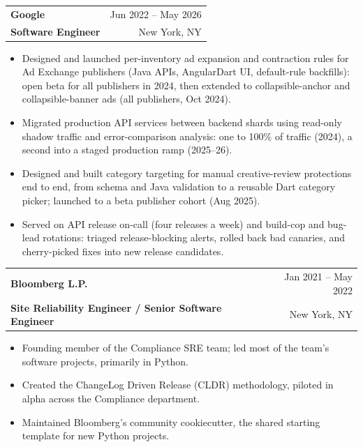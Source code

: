 \documentclass[letterpaper,10pt]{article}
\makeatletter
\newif\iffull
\newcommand{\more}[1]{\iffull#1\fi}
\newcommand{\short}[1]{\iffull\else#1\fi}
\newcommand{\sep}{\hspace{0.4em}{\color{hair}\textbullet}\hspace{0.4em}}
\newcommand{\role}[5]{%
  \par\addvspace{\iffull 8pt\else 4.5pt\fi}\needspace{3\baselineskip}%
  \noindent\begin{tabular*}{\textwidth}{@{}l@{\extracolsep{\fill}}r@{}}
    {\bfseries\fontsize{10.6pt}{12.6pt}\selectfont #1}%
      \if\relax\detokenize{#2}\relax\else{\color{muted}\sep #2}\fi &
    {\color{muted}\fontsize{9.4pt}{11pt}\selectfont #3} \\[0.2pt]
    {\color{accent}\bfseries\fontsize{9.6pt}{11.5pt}\selectfont #4} &
    {\color{muted}\fontsize{9.4pt}{11pt}\selectfont #5}
  \end{tabular*}\par\nobreak
}
\makeatother
\begin{document}
\role{Google}{Ad Manager}{Jun 2022 -- May 2026}
     {Software Engineer}{New York, NY}
\begin{itemize}
  \short{\item Designed and launched per-inventory ad expansion and contraction rules for Ad
        Exchange publishers (Java APIs, AngularDart UI, default-rule backfills): open beta for all
        publishers in 2024, then extended to collapsible-anchor and collapsible-banner ads (all
        publishers, Oct 2024).}
  \more{\item Designed and launched per-inventory ad expansion and contraction rules for Ad
        Exchange publishers (Java APIs, AngularDart UI, default rules backfilled for every
        network) to an open beta for all publishers in 2024; the first exchange rule built on
        Ad Manager's next-generation API stack.
  \item Added collapsible-anchor and collapsible-banner controls to those rules, from closed beta
        (May 2024) to all publishers (Oct 2024), then retired the launch flags and the legacy
        settings they replaced.}
  \item Migrated production API services between backend shards using read-only shadow traffic
        and error-comparison analysis: one to 100\% of traffic (2024), a second into a staged
        production ramp (2025--26).
  \item Designed and built category targeting for manual creative-review protections end to end,
        from schema and Java validation to a reusable Dart category picker; launched to a beta
        publisher cohort (Aug 2025).
  \more{\item Took over and shipped the bidder data-usage declarations UI (conflict badges,
        filters, and setting suggestions across nine declaration types) to beta publishers
        (Aug 2025).}
  \item Served on API release on-call (four releases a week) and build-cop and bug-lead
        rotations: triaged release-blocking alerts, rolled back bad canaries, and cherry-picked
        fixes into new release candidates.
  \more{\item Authored 20+ approved design docs and earned Java and Dart readability, Google's
        language-level code-review certifications.}
\end{itemize}

\role{Bloomberg L.P.}{Compliance SRE}{Jan 2021 -- May 2022}
     {Site Reliability Engineer / Senior Software Engineer}{New York, NY}
\begin{itemize}
  \item Founding member of the Compliance SRE team; led most of the team's software projects,
        primarily in Python.
  \item Created the ChangeLog Driven Release (CLDR) methodology, piloted in alpha across the
        Compliance department.
  \item Maintained Bloomberg's community cookiecutter, the shared starting template for new Python
        projects.
\end{itemize}
\end{document}
